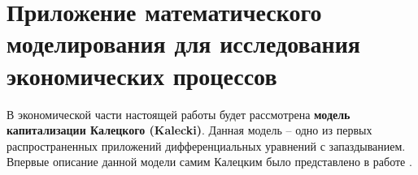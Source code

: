 \section{Приложение математического\\моделирования для исследования\\экономических процессов}

В экономической части настоящей работы будет рассмотрена \textbf{модель капитализации Калецкого (Kalecki)}. Данная модель \--- одно из первых распространенных приложений дифференциальных уравнений с запаздыванием. Впервые описание данной модели самим Калецким было представлено в работе \cite{bib:Kalecki}.